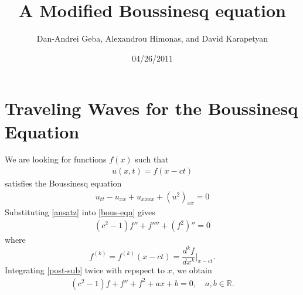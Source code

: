 \documentclass[12pt,reqno]{amsart}
\numberwithin{equation}{section}  %
\newcommand{\rr}{\mathbb{R}}
\begin{document}
\title{A Modified Boussinesq equation}
\author{Dan-Andrei Geba, Alexandrou Himonas, and David Karapetyan}
\address{Department of Mathematics, University of Rochester, Rochester, NY 14627}
\address{Department of Mathematics, University of Notre Dame, Notre Dame, IN 46556}
\address{Department of Mathematics, University of Notre Dame, Notre Dame, IN 46556}
\date{04/26/2011}
%
%
\maketitle
%
%
%
%
%
%
%
%
\section{Traveling Waves for the Boussinesq Equation} 
\label{sec:trav-wave}
We are looking for functions $f(x)$ such that
%
%
\begin{equation}
  \label{ansatz}
\begin{split}
u(x,t) = f(x-ct)
\end{split}
\end{equation}
%
%
satisfies the Boussinesq equation
%
%
\begin{equation}
  \label{bous-eqn}
\begin{split}
  u_{tt} - u_{xx} + u_{xxxx} + (u^{2})_{xx} = 0
\end{split}
\end{equation}
%
%
Substituting \eqref{ansatz} into \eqref{bous-eqn} gives
%
%
\begin{equation}
\begin{split}
  (c^{2}-1)f'' + f'''' + (f^{2})'' = 0
\end{split}
\label{post-sub}
\end{equation}
%
%
where $$f^{(k)} = f^{(k)}(x-ct) = \frac{d^{k}f}{dx^{k}} \Big |_{x-ct}.$$ 
Integrating \eqref{post-sub} twice with repspect to $x$, we obtain
%
%
\begin{equation}
  \label{pre-const-elim}
\begin{split}
  (c^{2}-1)f + f'' + f^{2} + ax +b = 0, \quad a,b \in \rr.
\end{split}
\end{equation}
%
%
\end{document}
